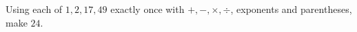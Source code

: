 Using each of $1,2,17,49$ exactly once with $+,-,\times,\div$, exponents and parentheses, make $24$.

